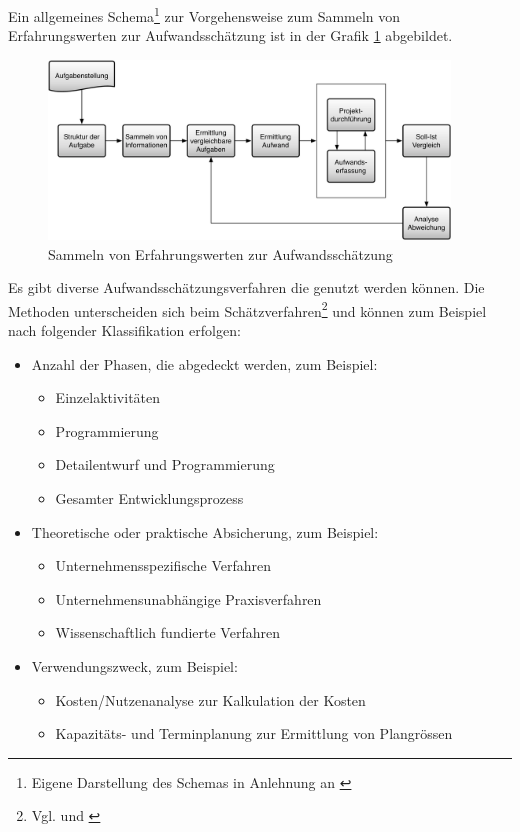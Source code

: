 Ein allgemeines Schema\footnote{Eigene Darstellung des Schemas in Anlehnung an \citealp*[S. 112]{litke2007projektmanagement}}
zur Vorgehensweise zum Sammeln von Erfahrungswerten zur Aufwandsschätzung ist in der Grafik \ref{pic:02_schema_aufwandsschaetzung}
abgebildet.

\begin{figure}[htbp]
\begin{center}
\includegraphics[width=0.95\textwidth,angle=0]{./bilder/theorie/02_schema_aufwandsschaetzung.pdf}
\caption{Sammeln von Erfahrungswerten zur Aufwandsschätzung}
\label{pic:02_schema_aufwandsschaetzung}
\end{center}
\end{figure}

Es gibt diverse Aufwandsschätzungsverfahren die genutzt werden können. Die Methoden unterscheiden
sich beim Schätzverfahren\footnote{Vgl. \citealp*{noth1986aufwandschaetzung} und \citealp*{knoell1991aufwandsschaetzung}}
und können zum Beispiel nach folgender Klassifikation erfolgen:

\begin{itemize}
    \item Anzahl der Phasen, die abgedeckt werden, zum Beispiel:
    \begin{itemize}
        \item Einzelaktivitäten
        \item Programmierung
        \item Detailentwurf und Programmierung
        \item Gesamter Entwicklungsprozess
    \end{itemize}
    \item Theoretische oder praktische Absicherung, zum Beispiel:
    \begin{itemize}
        \item Unternehmensspezifische Verfahren
        \item Unternehmensunabhängige Praxisverfahren
        \item Wissenschaftlich fundierte Verfahren
    \end{itemize}
    \item Verwendungszweck, zum Beispiel:
    \begin{itemize}
        \item Kosten/Nutzenanalyse zur Kalkulation der Kosten
        \item Kapazitäts- und Terminplanung zur Ermittlung von Plangrössen
    \end{itemize}
\end{itemize}


